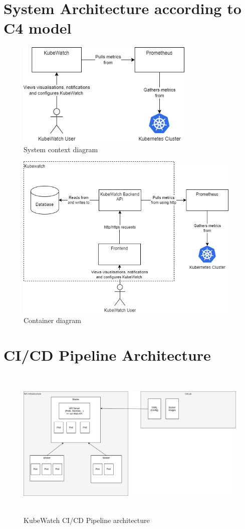 \section{System Architecture according to C4 model}
\begin{figure}[H]
  \centering
  \includegraphics[height=5cm]{resources/System_context_diagram.png}
  \caption{System context diagram}
  \label{fig:system-context-diagram}
\end{figure}

\begin{figure}[H]
  \centering
  \includegraphics[height=8cm]{resources/Container_diagram.png}
  \caption{Container diagram}
  \label{fig:container-diagram}
\end{figure}

\section{CI/CD Pipeline Architecture}

\begin{figure}[H]
  \centering
  \includegraphics[height=7.3cm]{resources/architecture.png}
  \caption{KubeWatch CI/CD Pipeline architecture}
  \label{fig:architecture}
\end{figure}

